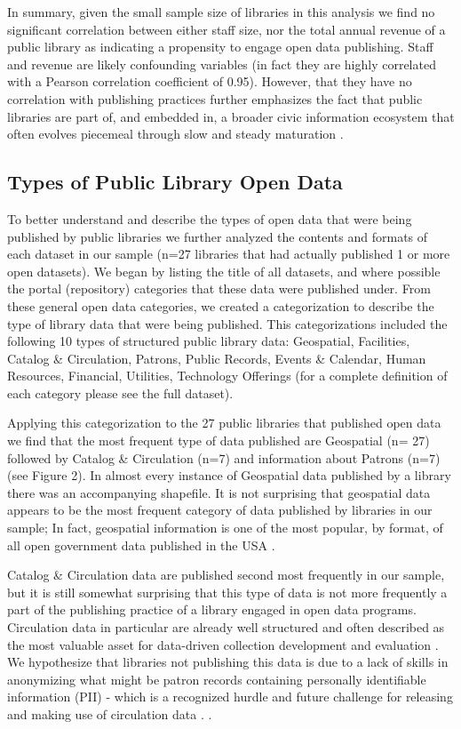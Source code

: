 \documentclass[sigconf]{acmart}
\begin{document}
In summary, given the small sample size of libraries in this analysis we find no significant correlation between either staff size, nor the total annual revenue of a public library as indicating a propensity to engage open data publishing. Staff and revenue are likely confounding variables (in fact they are highly correlated with a Pearson correlation coefficient of 0.95). However, that they have no correlation with publishing practices further emphasizes the fact that public libraries are part of, and embedded in, a broader civic information ecosystem that often evolves piecemeal through slow and steady maturation \cite{attard2015systematic}.

\subsection{Types of Public Library Open Data}
To better understand and describe the types of open data that were being published by public libraries we further analyzed the contents and formats of each dataset in our sample (n=27 libraries that had actually published 1 or more open datasets). We began by listing the title of all datasets, and where possible the portal (repository) categories that these data were published under. From these general open data categories, we created a categorization to describe the type of library data that were being published. This categorizations included the following 10 types of structured public library data: Geospatial, Facilities, Catalog \& Circulation, Patrons, Public Records, Events \& Calendar, Human Resources, Financial, Utilities, Technology Offerings (for a complete definition of each category please see the full dataset).

Applying this categorization to the 27 public libraries that published open data we find that the most frequent type of data published are Geospatial (n= 27) followed by Catalog \& Circulation (n=7) and information about Patrons (n=7) (see Figure 2). In almost every instance of Geospatial data published by a library there was an accompanying shapefile.  It is not surprising that geospatial data appears to be the most frequent category of data published by libraries in our sample; In fact, geospatial information is one of the most popular, by format, of all open government data published in the USA \cite{washington2016open}.

Catalog \& Circulation data are published second most frequently in our sample, but it is still somewhat surprising that this type of data is not more frequently a part of the publishing practice of a library engaged in open data programs. Circulation data in particular are already well structured and often described as the most valuable asset for data-driven collection development and evaluation \cite{knievel2006use}. We hypothesize that libraries not publishing this data is due to a lack of skills in anonymizing what might be patron records containing personally identifiable information (PII) - which is a recognized hurdle and future challenge for releasing and making use of circulation data \cite{renaud2015mining}. .
\end{document}
